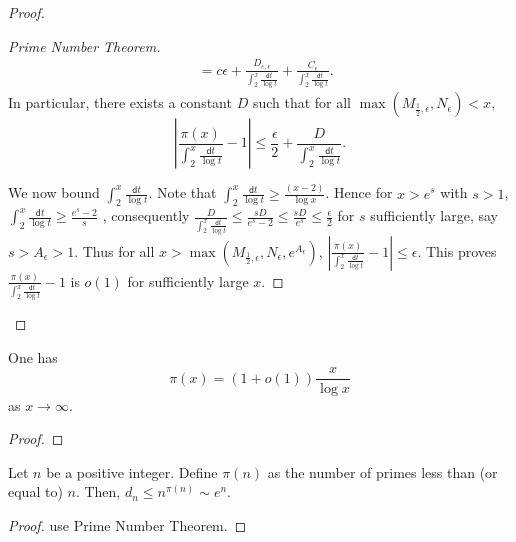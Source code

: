 \begin{proof}
\begin{proof}[Prime Number Theorem]
\[\begin{aligned}
     & =c\epsilon+\frac{D_{c,\epsilon}}{\int_{2}^{x}\frac{\mathsf{d}t}{\log t}}+\frac{C_{\epsilon}}{\int_{2}^{x}\frac{\mathsf{d}t}{\log t}}.
    \end{aligned}
    \]
    In particular, there exists a constant $D$ such that for all $\max\left(M_{\frac{1}{2},\epsilon},N_{\epsilon}\right)<x$,
    \[
    \left|\frac{\pi\left(x\right)}{\int_{2}^{x}\frac{\mathsf{d}t}{\log t}}-1\right|\le\frac{\epsilon}{2}+\frac{D}{\int_{2}^{x}\frac{\mathsf{d}t}{\log t}}.
    \]
    
    We now bound $\int_2^x\frac{\mathsf{d}t}{\log t}$. Note that $\int_{2}^{x}\frac{\mathsf{d}t}{\log t}\ge\frac{\left(x-2\right)}{\log x}$.
    Hence for $x>e^{s}$ with $s>1$, $\int_{2}^{x}\frac{\mathsf{d}t}{\log t}\ge\frac{e^{s}-2}{s}$
    , consequently $\frac{D}{\int_{2}^{x}\frac{\mathsf{d}t}{\log t}}\le\frac{sD}{e^{s}-2}\le\frac{sD}{e^{s}}\le\frac{\epsilon}{2}$
    for $s$ sufficiently large, say $s>A_{\epsilon}>1$.
    Thus for all $x>\max\left(M_{\frac{1}{2},\epsilon},N_{\epsilon},e^{A_{\epsilon}}\right)$,
    $\left|\frac{\pi\left(x\right)}{\int_{2}^{x}\frac{\mathsf{d}t}{\log t}}-1\right|\le\epsilon$.
    This proves $\frac{\pi\left(x\right)}{\int_{2}^{x}\frac{\mathsf{d}t}{\log t}}-1$
    is $o\left(1\right)$ for sufficiently large $x$.
    \end{proof}
\end{proof}

\begin{lemma}\label{pi_alt}
    One has 
    \[ \pi(x) = (1 + o(1))\frac{x}{\log x}\]
    as $x \rightarrow \infty$.
\end{lemma}
\begin{proof}
    \leanok
\end{proof}

\begin{lemma}\label{dn_asymptotic}
    Let $n$ be a positive integer. Define $\pi(n)$ as the number of primes less than (or equal to) $n$. Then, $d_n \leqslant n^{\pi(n)} \sim e^n$.
\end{lemma}
\begin{proof}
    \leanok
    use Prime Number Theorem. 
\end{proof}

